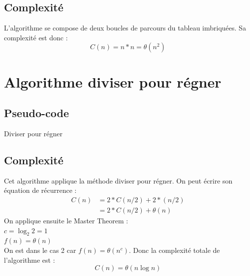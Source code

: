 \documentclass[11pt, a4paper]{article}
\begin{document}
\subsection{Complexité}
L'algorithme se compose de deux boucles de parcours du tableau imbriquées. Sa
complexité est donc :
\[C(n) = n*n = \theta{(n^2)}\]

\section{Algorithme diviser pour régner}
\subsection{Pseudo-code}

\begin{algorithm}[H]
  \caption{Diviser pour régner}
\end{algorithm}
\subsection{Complexité}
Cet algorithme applique la méthode diviser pour régner. On peut écrire son
équation de récurrence :
\begin{align*}
  C(n) & = 2*C(n/2) + 2*(n/2) \\
       & = 2*C(n/2) + \theta{(n)}
\end{align*}
On applique ensuite le Master Theorem : \\
$c = \log_2 2 = 1$ \\
$f(n) = \theta{(n)}$ \\
On est dans le cas 2 car $f(n) = \theta{(n^c)}$. Donc la complexité totale de
l'algorithme est :
\[ C(n) = \theta{(n \log n)} \]
\end{document}
